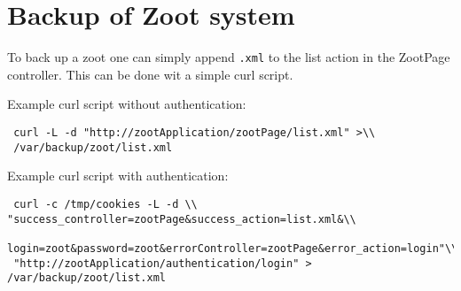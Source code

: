 \documentclass[a4paper,10pt]{article}
\begin{document}
\section{Backup of Zoot system}

To back up a zoot one can simply append \texttt{.xml} to the list action in the ZootPage controller. This can be done wit a simple curl script.

Example curl script without authentication:
\begin{lstlisting}
 curl -L -d "http://zootApplication/zootPage/list.xml" >\\
 /var/backup/zoot/list.xml
\end{lstlisting}

Example curl script with authentication:
\begin{lstlisting}
 curl -c /tmp/cookies -L -d \\
"success_controller=zootPage&success_action=list.xml&\\
 login=zoot&password=zoot&errorController=zootPage&error_action=login"\\
 "http://zootApplication/authentication/login" > /var/backup/zoot/list.xml
\end{lstlisting}
\end{document}
